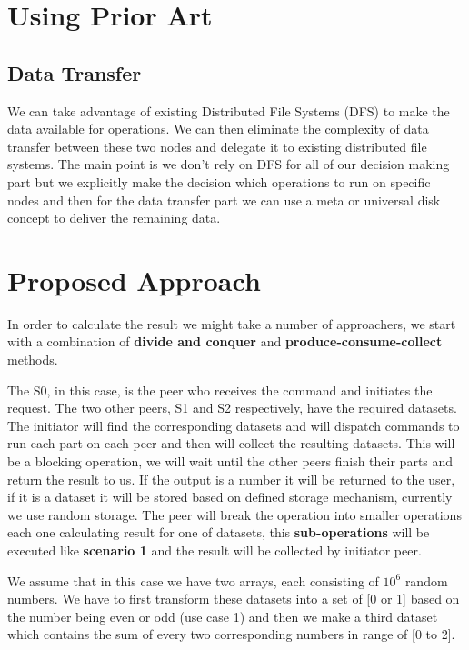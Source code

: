 \section{Using Prior Art}
\subsection{Data Transfer}
We can take advantage of existing Distributed File Systems
(DFS) to make the data available for operations. We can then eliminate
the complexity of data transfer between these two nodes and delegate it
to existing distributed file systems. The main point is we don't rely on
DFS for all of our decision making part but we explicitly make the 
decision which operations to run on specific nodes and then for the 
data transfer part we can use a meta or universal disk concept to deliver the
remaining data.


\section{Proposed Approach}
In order to calculate the result we might take a number of approachers, we start with a combination of \textbf{divide and conquer} and
\textbf{produce-consume-collect} methods.

The S0, in this case, is the peer who receives the command and initiates the request. The two other peers, S1 and S2 respectively, have the required
datasets. The initiator will find the corresponding datasets and will dispatch commands to run each part on each peer and then will collect
the resulting datasets. This will be a blocking operation, we will wait until the other peers finish their parts and return the result
to us. If the output is a number it will be returned to the user, if it is a dataset it will be stored based on defined storage mechanism, 
currently we use random storage. The peer will break the operation into smaller operations each one calculating result for one of datasets, 
this \textbf{sub-operations} will be executed like \textbf{scenario 1} and the result will be collected by initiator peer.

We assume that in this case we have two arrays, each consisting of \(10^6\) random numbers. We have to first transform these datasets into
a set of [0 or 1] based on the number being even or odd (use case 1) and then we make a third dataset which contains the sum of every two
corresponding numbers in range of [0 to 2].


